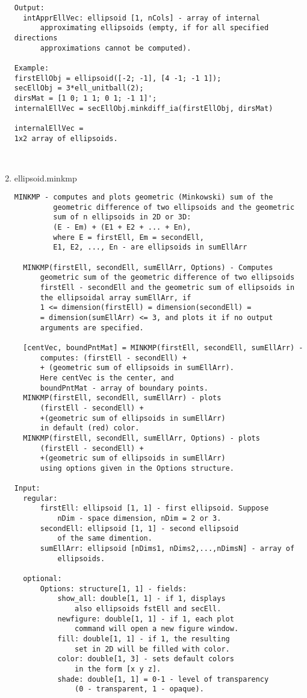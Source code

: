 \begin{enumerate}
\begin{lstlisting}
Output:
  intApprEllVec: ellipsoid [1, nCols] - array of internal
      approximating ellipsoids (empty, if for all specified directions
      approximations cannot be computed).

Example:
firstEllObj = ellipsoid([-2; -1], [4 -1; -1 1]);
secEllObj = 3*ell_unitball(2);
dirsMat = [1 0; 1 1; 0 1; -1 1]';
internalEllVec = secEllObj.minkdiff_ia(firstEllObj, dirsMat)

internalEllVec =
1x2 array of ellipsoids.



\end{lstlisting}
\fontfamily{\familydefault}
\selectfont
\item {ellipsoid.minkmp}
\selectfont
\begin{lstlisting}
MINKMP - computes and plots geometric (Minkowski) sum of the
         geometric difference of two ellipsoids and the geometric
         sum of n ellipsoids in 2D or 3D:
         (E - Em) + (E1 + E2 + ... + En),
         where E = firstEll, Em = secondEll,
         E1, E2, ..., En - are ellipsoids in sumEllArr

  MINKMP(firstEll, secondEll, sumEllArr, Options) - Computes
      geometric sum of the geometric difference of two ellipsoids
      firstEll - secondEll and the geometric sum of ellipsoids in
      the ellipsoidal array sumEllArr, if
      1 <= dimension(firstEll) = dimension(secondEll) =
      = dimension(sumEllArr) <= 3, and plots it if no output
      arguments are specified.

  [centVec, boundPntMat] = MINKMP(firstEll, secondEll, sumEllArr) -
      computes: (firstEll - secondEll) +
      + (geometric sum of ellipsoids in sumEllArr).
      Here centVec is the center, and
      boundPntMat - array of boundary points.
  MINKMP(firstEll, secondEll, sumEllArr) - plots
      (firstEll - secondEll) +
      +(geometric sum of ellipsoids in sumEllArr)
      in default (red) color.
  MINKMP(firstEll, secondEll, sumEllArr, Options) - plots
      (firstEll - secondEll) +
      +(geometric sum of ellipsoids in sumEllArr)
      using options given in the Options structure.

Input:
  regular:
      firstEll: ellipsoid [1, 1] - first ellipsoid. Suppose
          nDim - space dimension, nDim = 2 or 3.
      secondEll: ellipsoid [1, 1] - second ellipsoid
          of the same dimention.
      sumEllArr: ellipsoid [nDims1, nDims2,...,nDimsN] - array of
          ellipsoids.

  optional:
      Options: structure[1, 1] - fields:
          show_all: double[1, 1] - if 1, displays
              also ellipsoids fstEll and secEll.
          newfigure: double[1, 1] - if 1, each plot
              command will open a new figure window.
          fill: double[1, 1] - if 1, the resulting
              set in 2D will be filled with color.
          color: double[1, 3] - sets default colors
              in the form [x y z].
          shade: double[1, 1] = 0-1 - level of transparency
              (0 - transparent, 1 - opaque).


\end{lstlisting}
\end{enumerate}
